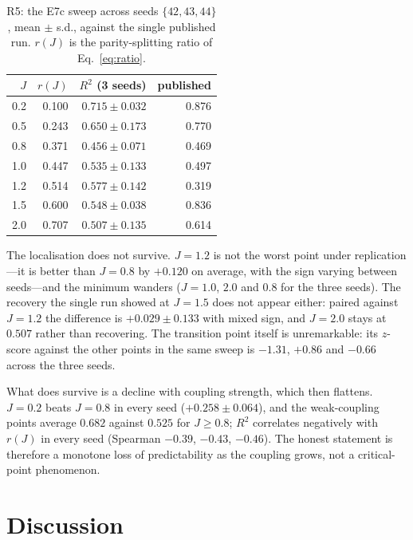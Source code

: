 \documentclass[twocolumn,10pt]{article}
\begin{document}
\begin{table}[h]
\centering
\caption{R5: the E7c sweep across seeds $\{42,43,44\}$, mean $\pm$ s.d.,
  against the single published run. $r(J)$ is the parity-splitting ratio
  of Eq.~\ref{eq:ratio}.\label{tab:r5}}
\footnotesize
\setlength{\tabcolsep}{4pt}
\begin{tabular}{rrrr}
\toprule
$J$ & $r(J)$ & $R^2$ (3 seeds) & published \\
\midrule
0.2 & 0.100 & $0.715 \pm 0.032$ & 0.876 \\
0.5 & 0.243 & $0.650 \pm 0.173$ & 0.770 \\
0.8 & 0.371 & $0.456 \pm 0.071$ & 0.469 \\
1.0 & 0.447 & $0.535 \pm 0.133$ & 0.497 \\
1.2 & 0.514 & $0.577 \pm 0.142$ & 0.319 \\
1.5 & 0.600 & $0.548 \pm 0.038$ & 0.836 \\
2.0 & 0.707 & $0.507 \pm 0.135$ & 0.614 \\
\bottomrule
\end{tabular}
\end{table}

The localisation does not survive.
$J = 1.2$ is not the worst point under replication---it is better than
$J = 0.8$ by $+0.120$ on average, with the sign varying between
seeds---and the minimum wanders ($J = 1.0$, $2.0$ and $0.8$ for the
three seeds).
The recovery the single run showed at $J = 1.5$ does not appear either:
paired against $J = 1.2$ the difference is $+0.029 \pm 0.133$ with mixed
sign, and $J = 2.0$ stays at $0.507$ rather than recovering.
The transition point itself is unremarkable: its $z$-score against the
other points in the same sweep is $-1.31$, $+0.86$ and $-0.66$ across
the three seeds.

What does survive is a decline with coupling strength, which then
flattens.
$J = 0.2$ beats $J = 0.8$ in every seed ($+0.258 \pm 0.064$), and the
weak-coupling points average $0.682$ against $0.525$ for
$J \geq 0.8$; $R^2$ correlates negatively with $r(J)$ in every seed
(Spearman $-0.39$, $-0.43$, $-0.46$).
The honest statement is therefore a monotone loss of predictability as
the coupling grows, not a critical-point phenomenon.

\section{Discussion}
\label{sec:discussion}
\end{document}
